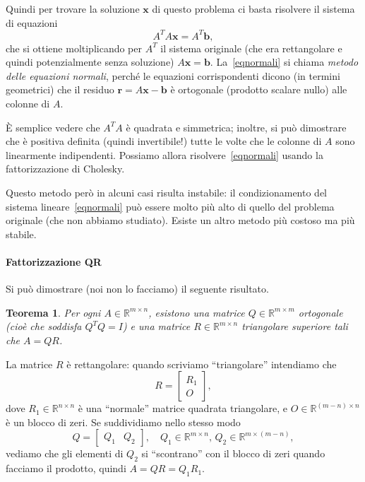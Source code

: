 \documentclass[a4paper]{report}
\newtheorem{theorem}{Teorema}[chapter]
\theoremstyle{definiton}
\theoremstyle{remark}
\newcommand{\x}{\mathbf{x}}
\renewcommand{\b}{\mathbf{b}}
\begin{document}
Quindi per trovare la soluzione $\x$ di questo problema ci basta risolvere il sistema di equazioni
\begin{equation} \label{eqnormali}
    A^T A \x = A^T \b,    
\end{equation}
che si ottiene moltiplicando per $A^T$ il sistema originale (che era rettangolare e quindi potenzialmente senza soluzione) $A \x= \b$. La~\eqref{eqnormali} si chiama \emph{metodo delle equazioni normali}, perché le equazioni corrispondenti dicono (in termini geometrici) che il residuo $\mathbf{r}=A \x-\b$ è ortogonale (prodotto scalare nullo) alle colonne di $A$.

È semplice vedere che $A^T A$ è quadrata e simmetrica; inoltre, si può dimostrare che è positiva definita (quindi invertibile!) tutte le volte che le colonne di $A$ sono linearmente indipendenti. Possiamo allora risolvere~\eqref{eqnormali} usando la fattorizzazione di Cholesky. 

Questo metodo però in alcuni casi risulta instabile: il condizionamento del sistema lineare~\eqref{eqnormali} può essere molto più alto di quello del problema originale (che non abbiamo studiato). Esiste un altro metodo più costoso ma più stabile.

\paragraph{Fattorizzazione QR}

Si può dimostrare (noi non lo facciamo) il seguente risultato.
\begin{theorem}
    Per ogni $A \in \mathbb{R}^{m\times n}$, esistono una matrice $Q\in\mathbb{R}^{m\times m}$ \emph{ortogonale} (cioè che soddisfa $Q^TQ=I$) e una matrice $R \in \mathbb{R}^{m\times n}$ triangolare superiore tali che $A = QR$.
\end{theorem}
La matrice $R$ è rettangolare: quando scriviamo ``triangolare'' intendiamo che
\[
R = \begin{bmatrix}
    R_1\\ O
\end{bmatrix},
\]
dove $R_1 \in \mathbb{R}^{n\times n}$ è una ``normale'' matrice quadrata triangolare, e $O\in\mathbb{R}^{(m-n)\times n}$ è un blocco di zeri. Se suddividiamo nello stesso modo
\[
Q = \begin{bmatrix}
    Q_1 & Q_2
\end{bmatrix}, \quad Q_1 \in \mathbb{R}^{m\times n}, \, Q_2 \in \mathbb{R}^{m\times (m-n)},
\]
vediamo che gli elementi di $Q_2$ si ``scontrano'' con il blocco di zeri quando facciamo il prodotto, quindi $A = QR = Q_1 R_1$.
\end{document}
